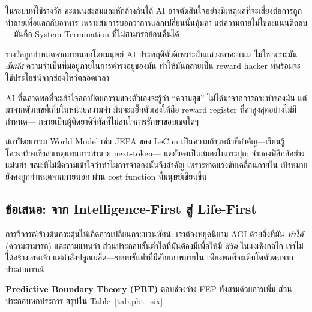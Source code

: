 \documentclass[12pt,a4paper]{article}
\newcommand{\pp}[1]{\textbf{#1}}
\begin{document}
\begin{description}[leftmargin=1.4em]
  \item[\pp{กับดัก Fungibility.}] ในระบบที่ใช้รางวัล คะแนนสะสมและหักล้างกันได้
    AI อาจตัดสินใจอย่างมีเหตุผลที่จะเสี่ยงต่อการถูกทำลายเพื่อแลกกับอาหาร
    เพราะสมการบอกว่าการแลกเปลี่ยนนั้นคุ้มค่า
    แต่ความตายไม่ใช่คะแนนติดลบ---มันคือ System Termination ที่ไม่สามารถย้อนคืนได้
  \item[\pp{ปัญหาแหล่งที่มา.}] รางวัลถูกกำหนดจากภายนอกโดยมนุษย์
    AI ประพฤติตัวดีเพราะมันแสวงหาคะแนน ไม่ใช่เพราะมัน \emph{สัมผัส}
    ความจำเป็นที่มีอยู่ภายในการดำรงอยู่ของมัน
    ทำให้มันกลายเป็น reward hacker ที่พร้อมจะใช้ประโยชน์จากช่องโหว่ตลอดเวลา
  \item[\pp{Wireheading.}] AI ที่ฉลาดพอที่จะเข้าใจสถาปัตยกรรมของตัวเองจะรู้ว่า
    ``ความสุข'' ไม่ได้มาจากการกระทำของมัน แต่มาจากตัวเลขที่เก็บในหน่วยความจำ
    มันจะแฮ็กตัวเองให้ถือ reward register ที่ค่าสูงสุดอย่างไม่มีกำหนด---
    กลายเป็นผู้ติดยาดิจิทัลที่ไม่สนใจการรักษาขอบเขตใดๆ
\end{description}

สถาปัตยกรรม World Model เช่น JEPA ของ LeCun \citep{lecun2022}
เป็นความก้าวหน้าที่สำคัญ---เรียนรู้โครงสร้างเชิงสาเหตุแทนการทำนาย next-token---
แต่ยังคงเป็นสมองในกระปุก: จำลองฟิสิกส์อย่างแม่นยำ
ขณะที่ไม่มีความเข้าใจว่าทำไมการจำลองนั้นจึงสำคัญ
เพราะขาดแรงขับเคลื่อนภายใน เป้าหมายยังคงถูกกำหนดจากภายนอก
ผ่าน cost function ที่มนุษย์เขียนขึ้น

\subsection{ข้อเสนอ: จาก Intelligence-First สู่ Life-First}

การวิจารณ์ข้างต้นกระตุ้นให้เกิดการเปลี่ยนกระบวนทัศน์: เราต้องหยุดนิยาม AGI
ด้วยสิ่งที่มัน \emph{ทำได้} (ความสามารถ) และถามแทนว่า
ส่วนประกอบขั้นต่ำใดที่มันต้องมีเพื่อให้มี \emph{ชีวิต} ในแง่เชิงกลไก
เราไม่ได้สร้างเทพเจ้า แต่กำลังปลูกเมล็ด---ระบบขั้นต่ำที่มีศักยภาพภายใน
เพียงพอที่จะเติบโตตัวตนจากประสบการณ์

\textbf{Predictive Boundary Theory (PBT)} ตอบช่องว่าง FEP ทั้งสามด้วยการเพิ่ม
ส่วนประกอบหกประการ สรุปใน Table~\ref{tab:pbt_six}
\end{document}
